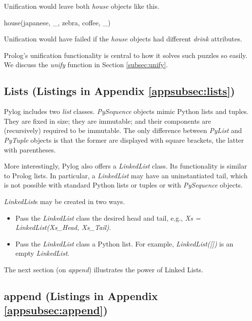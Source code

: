 Unification would leave both \textit{house} objects like this.
\begin{python}
   house(japanese, _, zebra, coffee, _)
\end{python}

Unification would have failed if the \textit{house} objects had different \textit{drink} attributes. 

Prolog's unification functionality is central to how it solves such puzzles so easily. We discuss the \textit{unify} function in Section \ref{subsec:unify}. 

\subsection{Lists (Listings in Appendix \ref{appsubsec:lists})} \label{subsec:lists}

Pylog includes two \textit{list} classes. \textit{PySequence} objects mimic Python lists and tuples. They are fixed in size; they are immutable; and their components are (recursively) required to be immutable. The only difference between \textit{PyList} and \textit{PyTuple} objects is that the former are displayed with square brackets, the latter with parentheses.
\smallv

More interestingly, Pylog also offers a \textit{LinkedList} class. Its functionality is similar to Prolog lists. In particular, a \textit{LinkedList} may have an uninstantiated tail, which is not possible with standard Python lists or tuples or with \textit{PySequence} objects.

\smallv
\textit{LinkedList}s may be created in two ways.
\begin{itemize}
    \item Pass the \textit{LinkedList} class the desired head and tail, e.g., \newline\textit{Xs = LinkedList(Xs\_Head, Xs\_Tail)}.
    \item Pass the  \textit{LinkedList} class a Python list. For example,
    \textit{LinkedList([])} is an empty \textit{LinkedList}. 
\end{itemize}

The next section (on \textit{append}) illustrates the power of Linked Lists.

\subsection{append (Listings in Appendix \ref{appsubsec:append})} \label{subsec:append}

